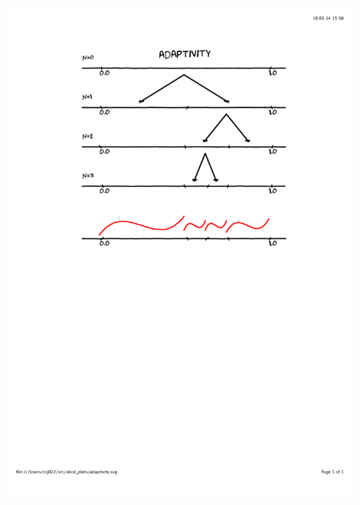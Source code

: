 \begin{frame}
\begin{columns}
\begin{column}[b]{0.45\linewidth}
\centering
\includegraphics[scale=0.3, clip, viewport=100 400 500 800]
    {figures/adaptivity.pdf}
\end{column}


\end{columns}
\end{frame}
